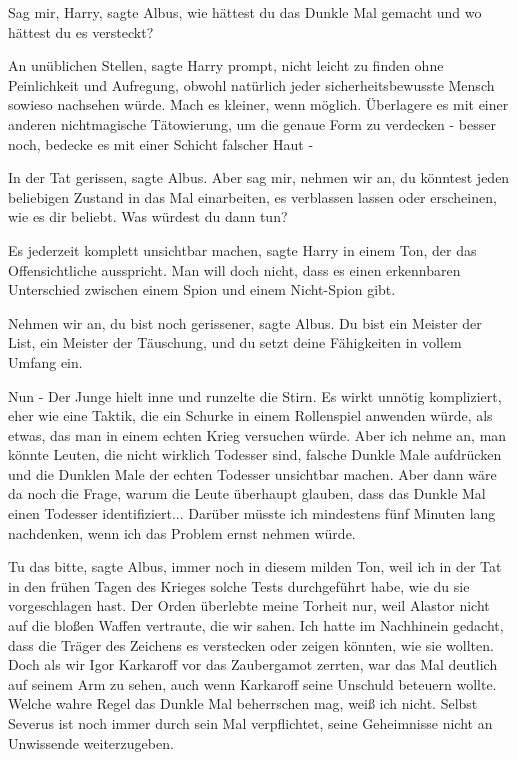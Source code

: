 \glqq Sag mir, Harry\grqq{}, sagte Albus, \glqq wie hättest du das Dunkle Mal
gemacht und wo hättest du es versteckt?\grqq{}

\glqq An unüblichen Stellen\grqq{}, sagte Harry prompt, \glqq nicht leicht zu
finden ohne Peinlichkeit und Aufregung, obwohl natürlich jeder
sicherheitsbewusste Mensch sowieso nachsehen würde. Mach es kleiner, wenn
möglich. Überlagere es mit einer anderen nichtmagische Tätowierung, um die
genaue Form zu verdecken - besser noch, bedecke es mit einer Schicht falscher
Haut -\grqq{}

\glqq In der Tat gerissen\grqq{}, sagte Albus. \glqq Aber sag mir, nehmen wir
an, du könntest jeden beliebigen Zustand in das Mal einarbeiten, es verblassen
lassen oder erscheinen, wie es dir beliebt. Was würdest du dann tun?\grqq{}

\glqq Es jederzeit komplett unsichtbar machen\grqq{}, sagte Harry in einem Ton,
der das Offensichtliche ausspricht. \glqq Man will doch nicht, dass es einen
erkennbaren Unterschied zwischen einem Spion und einem Nicht-Spion gibt.\grqq{}

\glqq Nehmen wir an, du bist noch gerissener\grqq{}, sagte Albus. \glqq Du bist
ein Meister der List, ein Meister der Täuschung, und du setzt deine Fähigkeiten
in vollem Umfang ein.\grqq{}

\glqq Nun -\grqq{} Der Junge hielt inne und runzelte die Stirn. \glqq Es wirkt
unnötig kompliziert, eher wie eine Taktik, die ein Schurke in einem Rollenspiel
anwenden würde, als etwas, das man in einem echten Krieg versuchen würde. Aber
ich nehme an, man könnte Leuten, die nicht wirklich Todesser sind, falsche
Dunkle Male aufdrücken und die Dunklen Male der echten Todesser unsichtbar
machen. Aber dann wäre da noch die Frage, warum die Leute überhaupt glauben,
dass das Dunkle Mal einen Todesser identifiziert... Darüber müsste ich
mindestens fünf Minuten lang nachdenken, wenn ich das Problem ernst nehmen
würde.\grqq{}

\glqq Tu das bitte\grqq{}, sagte Albus, immer noch in diesem milden Ton, \glqq
weil ich in der Tat in den frühen Tagen des Krieges solche Tests durchgeführt
habe, wie du sie vorgeschlagen hast. Der Orden überlebte meine Torheit nur, weil
Alastor nicht auf die bloßen Waffen vertraute, die wir sahen. Ich hatte im
Nachhinein gedacht, dass die Träger des Zeichens es verstecken oder zeigen
könnten, wie sie wollten. Doch als wir Igor Karkaroff vor das Zaubergamot
zerrten, war das Mal deutlich auf seinem Arm zu sehen, auch wenn Karkaroff seine
Unschuld beteuern wollte. Welche wahre Regel das Dunkle Mal beherrschen mag,
weiß ich nicht. Selbst Severus ist noch immer durch sein Mal verpflichtet, seine
Geheimnisse nicht an Unwissende weiterzugeben.\grqq{}

